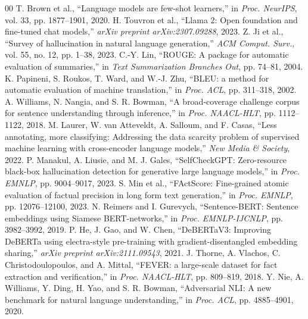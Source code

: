 \documentclass[conference]{IEEEtran}
\begin{document}
\begin{thebibliography}{00}
 T. Brown et al., ``Language models are few-shot learners,'' in \textit{Proc. NeurIPS}, vol. 33, pp. 1877--1901, 2020.
 H. Touvron et al., ``Llama 2: Open foundation and fine-tuned chat models,'' \textit{arXiv preprint arXiv:2307.09288}, 2023.
 Z. Ji et al., ``Survey of hallucination in natural language generation,'' \textit{ACM Comput. Surv.}, vol. 55, no. 12, pp. 1--38, 2023.
 C.-Y. Lin, ``ROUGE: A package for automatic evaluation of summaries,'' in \textit{Text Summarization Branches Out}, pp. 74--81, 2004.
 K. Papineni, S. Roukos, T. Ward, and W.-J. Zhu, ``BLEU: a method for automatic evaluation of machine translation,'' in \textit{Proc. ACL}, pp. 311--318, 2002.
 A. Williams, N. Nangia, and S. R. Bowman, ``A broad-coverage challenge corpus for sentence understanding through inference,'' in \textit{Proc. NAACL-HLT}, pp. 1112--1122, 2018.
 M. Laurer, W. van Atteveldt, A. Salloum, and F. Casas, ``Less annotating, more classifying: Addressing the data scarcity problem of supervised machine learning with cross-encoder language models,'' \textit{New Media \& Society}, 2022.
 P. Manakul, A. Liusie, and M. J. Gales, ``SelfCheckGPT: Zero-resource black-box hallucination detection for generative large language models,'' in \textit{Proc. EMNLP}, pp. 9004--9017, 2023.
 S. Min et al., ``FActScore: Fine-grained atomic evaluation of factual precision in long form text generation,'' in \textit{Proc. EMNLP}, pp. 12076--12100, 2023.
 N. Reimers and I. Gurevych, ``Sentence-BERT: Sentence embeddings using Siamese BERT-networks,'' in \textit{Proc. EMNLP-IJCNLP}, pp. 3982--3992, 2019.
 P. He, J. Gao, and W. Chen, ``DeBERTaV3: Improving DeBERTa using electra-style pre-training with gradient-disentangled embedding sharing,'' \textit{arXiv preprint arXiv:2111.09543}, 2021.
 J. Thorne, A. Vlachos, C. Christodoulopoulos, and A. Mittal, ``FEVER: a large-scale dataset for fact extraction and verification,'' in \textit{Proc. NAACL-HLT}, pp. 809--819, 2018.
 Y. Nie, A. Williams, Y. Ding, H. Yao, and S. R. Bowman, ``Adversarial NLI: A new benchmark for natural language understanding,'' in \textit{Proc. ACL}, pp. 4885--4901, 2020.
\end{thebibliography}
\end{document}
